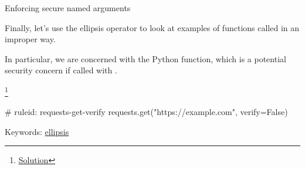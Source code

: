 \documentclass[aspectratio=169, handout]{beamer}
\newenvironment{exercisePage}[1]{
  \begin{minipage}[t][0.4in][t]{\textwidth}
    \Large \term{Exercise:} #1
  \end{minipage}
  \begin{minipage}[t][2.6in][t]{\textwidth}
}{
  \end{minipage}
}
\newcommand\blfootnote[1]{
    \begingroup
    \renewcommand\thefootnote{}\footnote{#1}
    \addtocounter{footnote}{-1}
    \endgroup
}
\newcommand\solutionLink[1]{
  \blfootnote{\color{blue}\href{#1}{Solution}}
}
\newcommand\ellipsisLink[1][]{{\color{blue}\href{https://semgrep.dev/docs/writing-rules/pattern-syntax\#ellipsis-operator}{ellipsis}}}
\begin{document}
\begin{frame}[fragile]
  \begin{exercisePage}{Enforcing secure named arguments}
    Finally, let's use the ellipsis operator to look at examples of functions
    called in an improper way.

    \vspace{\fill}

    In particular, we are concerned with the Python  function,
    which is a potential security concern if called with .
    \solutionLink{https://semgrep.dev/playground/r/NbU3pEw/semgrep.requests-get-verify-solution}

    \vspace{\fill}

    \begin{pythoncodeblock}
      # ruleid: requests-get-verify
      requests.get("https://example.com", verify=False)
    \end{pythoncodeblock}

    \vspace{\fill}

    Keywords: \ellipsisLink
  \end{exercisePage}
\end{frame}

\end{document}
